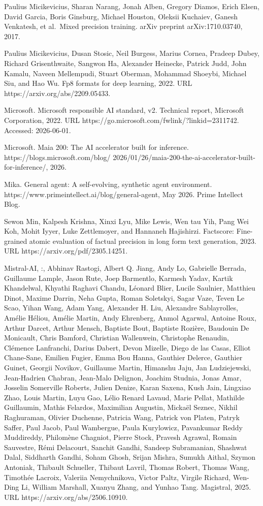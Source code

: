 Paulius Micikevicius, Sharan Narang, Jonah Alben, Gregory Diamos, Erich
Elsen, David Garcia, Boris Ginsburg, Michael Houston, Oleksii Kuchaiev,
Ganesh Venkatesh, et al.~Mixed precision training. arXiv preprint
arXiv:1710.03740, 2017.

Paulius Micikevicius, Dusan Stosic, Neil Burgess, Marius Cornea, Pradeep
Dubey, Richard Grisenthwaite, Sangwon Ha, Alexander Heinecke, Patrick
Judd, John Kamalu, Naveen Mellempudi, Stuart Oberman, Mohammad Shoeybi,
Michael Siu, and Hao Wu. Fp8 formats for deep learning, 2022. URL https://arxiv.org/abs/2209.05433.

Microsoft. Microsoft responsible AI standard, v2. Technical report,
Microsoft Corporation, 2022. URL
https://go.microsoft.com/fwlink/?linkid=2311742. Accessed: 2026-06-01.

Microsoft. Maia 200: The AI accelerator built for inference.
https://blogs.microsoft.com/blog/
2026/01/26/maia-200-the-ai-accelerator-built-for-inference/, 2026.

Mika. General agent: A self-evolving, synthetic agent environment.
https://www.primeintellect.ai/blog/general-agent, May 2026. Prime
Intellect Blog.

Sewon Min, Kalpesh Krishna, Xinxi Lyu, Mike Lewis, Wen tau Yih, Pang Wei
Koh, Mohit Iyyer, Luke Zettlemoyer, and Hannaneh Hajishirzi. Factscore:
Fine-grained atomic evaluation of factual precision in long form text
generation, 2023. URL https://arxiv.org/pdf/2305.14251.



Mistral-AI, :, Abhinav Rastogi, Albert Q. Jiang, Andy Lo, Gabrielle
Berrada, Guillaume Lample, Jason Rute, Joep Barmentlo, Karmesh Yadav,
Kartik Khandelwal, Khyathi Raghavi Chandu, Léonard Blier, Lucile
Saulnier, Matthieu Dinot, Maxime Darrin, Neha Gupta, Roman Soletskyi,
Sagar Vaze, Teven Le Scao, Yihan Wang, Adam Yang, Alexander H. Liu,
Alexandre Sablayrolles, Amélie Héliou, Amélie Martin, Andy Ehrenberg,
Anmol Agarwal, Antoine Roux, Arthur Darcet, Arthur Mensch, Baptiste
Bout, Baptiste Rozière, Baudouin De Monicault, Chris Bamford, Christian
Wallenwein, Christophe Renaudin, Clémence Lanfranchi, Darius Dabert,
Devon Mizelle, Diego de las Casas, Elliot Chane-Sane, Emilien Fugier,
Emma Bou Hanna, Gauthier Delerce, Gauthier Guinet, Georgii Novikov,
Guillaume Martin, Himanshu Jaju, Jan Ludziejewski, Jean-Hadrien Chabran,
Jean-Malo Delignon, Joachim Studnia, Jonas Amar, Josselin Somerville
Roberts, Julien Denize, Karan Saxena, Kush Jain, Lingxiao Zhao, Louis
Martin, Luyu Gao, Lélio Renard Lavaud, Marie Pellat, Mathilde
Guillaumin, Mathis Felardos, Maximilian Augustin, Mickaël Seznec, Nikhil
Raghuraman, Olivier Duchenne, Patricia Wang, Patrick von Platen, Patryk
Saffer, Paul Jacob, Paul Wambergue, Paula Kurylowicz, Pavankumar Reddy
Muddireddy, Philomène Chagniot, Pierre Stock, Pravesh Agrawal, Romain
Sauvestre, Rémi Delacourt, Sanchit Gandhi, Sandeep Subramanian, Shashwat
Dalal, Siddharth Gandhi, Soham Ghosh, Srijan Mishra, Sumukh Aithal,
Szymon Antoniak, Thibault Schueller, Thibaut Lavril, Thomas Robert,
Thomas Wang, Timothée Lacroix, Valeriia Nemychnikova, Victor Paltz,
Virgile Richard, Wen-Ding Li, William Marshall, Xuanyu Zhang, and Yunhao
Tang. Magistral, 2025. URL https://arxiv.org/abs/2506.10910.

